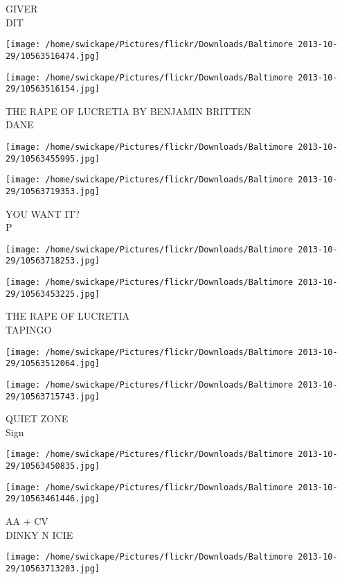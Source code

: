 \documentclass[10pt,letterpaper]{article}
\begin{document}
GIVER\\
DIT
\pagebreak

\texttt{[image: /home/swickape/Pictures/flickr/Downloads/Baltimore 2013-10-29/10563516474.jpg]}

\vspace{0.25in}
\texttt{[image: /home/swickape/Pictures/flickr/Downloads/Baltimore 2013-10-29/10563516154.jpg]}

THE RAPE OF LUCRETIA BY BENJAMIN BRITTEN\\
DANE
\pagebreak

\texttt{[image: /home/swickape/Pictures/flickr/Downloads/Baltimore 2013-10-29/10563455995.jpg]}

\vspace{0.25in}
\texttt{[image: /home/swickape/Pictures/flickr/Downloads/Baltimore 2013-10-29/10563719353.jpg]}

YOU WANT IT?\\
P
\pagebreak

\texttt{[image: /home/swickape/Pictures/flickr/Downloads/Baltimore 2013-10-29/10563718253.jpg]}

\vspace{0.25in}
\texttt{[image: /home/swickape/Pictures/flickr/Downloads/Baltimore 2013-10-29/10563453225.jpg]}

THE RAPE OF LUCRETIA\\
TAPINGO
\pagebreak

\texttt{[image: /home/swickape/Pictures/flickr/Downloads/Baltimore 2013-10-29/10563512064.jpg]}

\vspace{0.25in}
\texttt{[image: /home/swickape/Pictures/flickr/Downloads/Baltimore 2013-10-29/10563715743.jpg]}

QUIET ZONE\\
Sign
\pagebreak

\texttt{[image: /home/swickape/Pictures/flickr/Downloads/Baltimore 2013-10-29/10563450835.jpg]}

\vspace{0.25in}
\texttt{[image: /home/swickape/Pictures/flickr/Downloads/Baltimore 2013-10-29/10563461446.jpg]}

AA + CV\\
DINKY N ICIE
\pagebreak

\texttt{[image: /home/swickape/Pictures/flickr/Downloads/Baltimore 2013-10-29/10563713203.jpg]}
\end{document}
